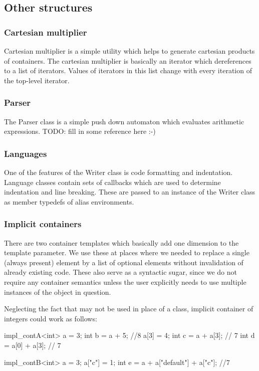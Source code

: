 \subsection*{Other structures}

\subsubsection{Cartesian multiplier}
   Cartesian multiplier is a simple utility which helps to generate cartesian products of containers. The cartesian multiplier is basically an iterator which dereferences to a list of iterators. Values of iterators in this list change with every iteration of the top-level iterator.

\subsubsection{Parser}
  The Parser class is a simple push down automaton which evaluates arithmetic expressions. TODO: fill in some reference here :-)

\subsubsection{Languages}
  One of the features of the Writer class is code formatting and indentation. Language classes contain sets of callbacks which are used to determine indentation and line breaking. These are passed to an instance of the Writer class as member typedefs of alias environments.

\subsubsection{Implicit containers}
  There are two container templates which basically add one dimension to the template parameter. We use these at places where we needed to replace a single (always present) element by a list of optional elements without invalidation of already existing code. These also serve as a syntactic sugar, since we do not require any container semantics unless the user explicitly needs to use multiple instances of the object in question.

  Neglecting the fact that  may not be used in place of a class, implicit container of integers could work as follows:
\mybeginfig
\begin{code}
impl_contA<int> a = 3;
int b = a + 5; //8
a[3] = 4;
int c = a + a[3]; // 7
int d = a[0] + a[3]; // 7

impl_contB<int> a = 3;
a["c"] = 1;
int e = a + a["default"] + a["c"]; //7
\end{code}

